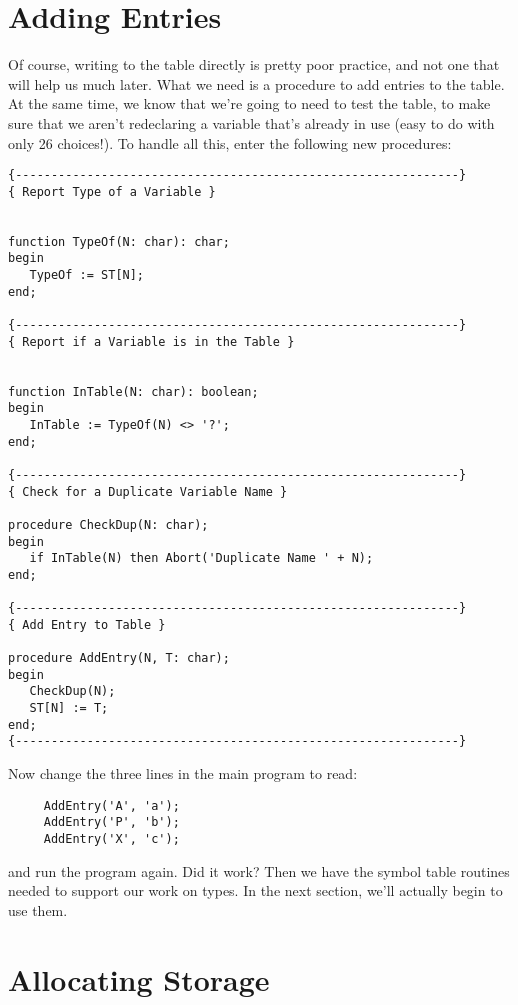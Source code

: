 \section{Adding Entries}

Of course, writing to the table directly is pretty poor practice, and not one that will  help  us  much  later. What we need is a procedure to add entries to the table. At the same time, we know that  we're going to need to test the table, to make sure that we aren't redeclaring a variable that's already in use  (easy  to do with only 26 choices!). To handle all this, enter  the following new procedures:

\begin{verbatim}
{--------------------------------------------------------------}
{ Report Type of a Variable }


function TypeOf(N: char): char;
begin
   TypeOf := ST[N];
end;

{--------------------------------------------------------------}
{ Report if a Variable is in the Table }


function InTable(N: char): boolean;
begin
   InTable := TypeOf(N) <> '?';
end;

{--------------------------------------------------------------}
{ Check for a Duplicate Variable Name }

procedure CheckDup(N: char);
begin
   if InTable(N) then Abort('Duplicate Name ' + N);
end;

{--------------------------------------------------------------}
{ Add Entry to Table }

procedure AddEntry(N, T: char);
begin
   CheckDup(N);
   ST[N] := T;
end;
{--------------------------------------------------------------}
\end{verbatim}

Now change the three lines in the main program to read:

\begin{verbatim}
     AddEntry('A', 'a');
     AddEntry('P', 'b');
     AddEntry('X', 'c');
\end{verbatim}

and run the program again. Did it work?  Then we have the symbol table routines needed to support our work on types. In  the next section, we'll actually begin to use them.

\section{Allocating Storage}

